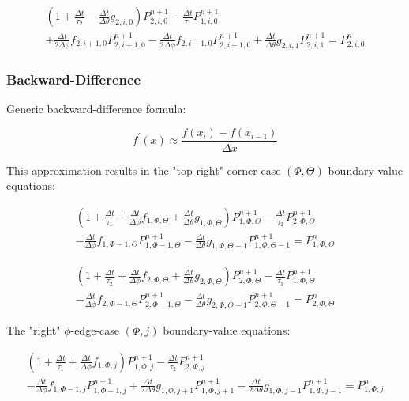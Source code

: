 \documentclass[12pt,a4paper,pagesize=pdftex]{scrartcl}
\begin{document}
\begin{multline*}
    \left(1 + \frac{\Delta t}{\tau_2} - \frac{\Delta t}{\Delta \theta}g_{2,i,0}\right)P^{n+1}_{2,i,0} - \frac{\Delta t}{\tau_1}P^{n+1}_{1,i,0} \\+ \frac{\Delta t}{2 \Delta \phi} f_{2,i+1,0} P^{n+1}_{2,i+1,0} - \frac{\Delta t}{2 \Delta \phi} f_{2,i-1,0} P^{n+1}_{2,i-1,0} + \frac{\Delta t}{\Delta \theta} g_{2,i,1} P^{n+1}_{2,i,1} = P^n_{2,i,0}
\end{multline*}

\subsubsection*{Backward-Difference}
Generic backward-difference formula:

\begin{equation*}
    f^\prime\left(x\right) \approx \frac{f\left(x_i\right) - f\left(x_{i-1}\right)}{\Delta x}
\end{equation*}

This approximation results in the "top-right" corner-case \(\left(\Phi,\Theta\right)\) boundary-value equations:

\begin{multline*}
    \left(1 + \frac{\Delta t}{\tau_1} + \frac{\Delta t}{\Delta \phi} f_{1,\Phi,\Theta} + \frac{\Delta t}{\Delta \theta} g_{1,\Phi,\Theta}\right) P^{n+1}_{1,\Phi,\Theta} - \frac{\Delta t}{\tau_2} P^{n+1}_{2,\Phi,\Theta} \\- \frac{\Delta t}{\Delta \phi} f_{1,\Phi-1,\Theta} P^{n+1}_{1,\Phi-1,\Theta} - \frac{\Delta t}{\Delta \theta} g_{1,\Phi,\Theta-1} P^{n+1}_{1,\Phi,\Theta-1} = P^n_{1,\Phi,\Theta}
\end{multline*}

\begin{multline*}
    \left(1 + \frac{\Delta t}{\tau_2} + \frac{\Delta t}{\Delta \phi} f_{2,\Phi,\Theta} + \frac{\Delta t}{\Delta \theta} g_{2,\Phi,\Theta}\right) P^{n+1}_{2,\Phi,\Theta} - \frac{\Delta t}{\tau_1} P^{n+1}_{1,\Phi,\Theta} \\- \frac{\Delta t}{\Delta \phi} f_{2,\Phi-1,\Theta} P^{n+1}_{2,\Phi-1,\Theta} - \frac{\Delta t}{\Delta \theta} g_{2,\Phi,\Theta-1} P^{n+1}_{2,\Phi,\Theta-1} = P^n_{2,\Phi,\Theta}
\end{multline*}

The "right" \(\phi\)-edge-case \(\left(\Phi,j\right)\) boundary-value equations:

\begin{multline*}
    \left(1 + \frac{\Delta t}{\tau_1} + \frac{\Delta t}{\Delta \phi}f_{1,\Phi,j}\right) P^{n+1}_{1,\Phi,j} - \frac{\Delta t}{\tau_2} P^{n+1}_{2,\Phi,j} \\- \frac{\Delta t}{\Delta \phi} f_{1,\Phi-1,j} P^{n+1}_{1,\Phi-1,j} + \frac{\Delta t}{2 \Delta \theta} g_{1,\Phi,j+1} P^{n+1}_{1,\Phi,j+1} - \frac{\Delta t}{2 \Delta \theta} g_{1,\Phi,j-1} P^{n+1}_{1,\Phi,j-1} = P^n_{1,\Phi,j}
\end{multline*}
\end{document}
